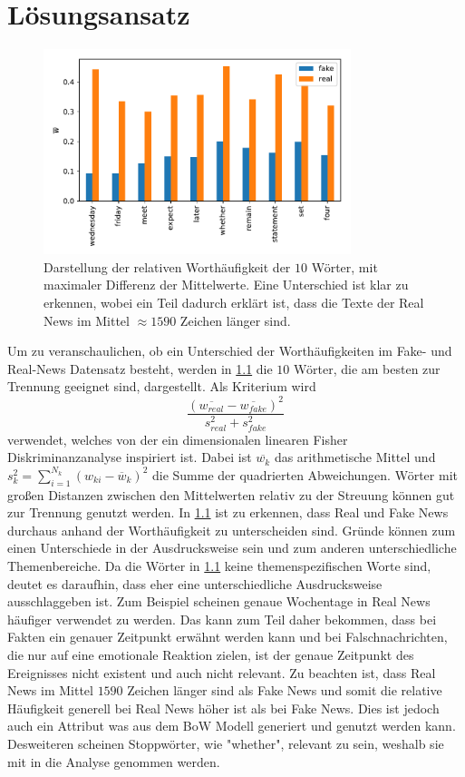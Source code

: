 \chapter{Lösungsansatz}

\begin{figure}
    \centering
    \includegraphics[width=0.8\textwidth]{pictures/data_visualisation.pdf}
    \caption{Darstellung der relativen Worthäufigkeit der $10$ Wörter, mit maximaler Differenz der Mittelwerte.
            Eine Unterschied ist klar zu erkennen, wobei ein Teil dadurch erklärt ist, dass die Texte der Real 
            News im Mittel $\approx 1590$ Zeichen länger sind.}
    \label{fig:word_plot}
\end{figure}
Um zu veranschaulichen, ob ein Unterschied der Worthäufigkeiten im Fake- und Real-News Datensatz besteht, werden in \ref{fig:word_plot}
die $10$ Wörter, die am besten zur Trennung geeignet sind, dargestellt. 
Als Kriterium wird 
\begin{equation}
    \frac{(\overline{w_{real}}-\overline{w_{fake}})^2}{s_{real}^2+s_{fake}^2}
\end{equation}
verwendet, welches von der ein dimensionalen linearen Fisher Diskriminanzanalyse inspiriert ist. 
Dabei ist $\overline{w_k}$ das arithmetische Mittel und $s_{k}^{2}=\sum_{i=1}^{N_{k}}\left(w_{k i}-\overline{w}_{k}\right)^{2}$ 
die Summe der quadrierten Abweichungen.
Wörter mit großen Distanzen zwischen den Mittelwerten relativ zu der Streuung können gut zur Trennung genutzt werden.
In \ref{fig:word_plot} ist zu erkennen, dass Real und Fake News durchaus anhand der Worthäufigkeit zu unterscheiden sind. 
Gründe können zum einen Unterschiede in der Ausdrucksweise sein und zum anderen unterschiedliche Themenbereiche. Da die 
Wörter in \ref{fig:word_plot} keine themenspezifischen Worte sind, deutet es daraufhin, dass eher eine unterschiedliche 
Ausdrucksweise ausschlaggeben ist. 
Zum Beispiel scheinen genaue Wochentage in Real News häufiger verwendet zu werden. 
Das kann zum Teil daher bekommen, dass bei Fakten ein genauer Zeitpunkt erwähnt werden kann und bei Falschnachrichten, die 
nur auf eine emotionale Reaktion zielen, ist der genaue Zeitpunkt des Ereignisses nicht existent und auch nicht relevant.
Zu beachten ist, dass Real News im Mittel $\num{1590}$ Zeichen länger sind als Fake News und somit die relative Häufigkeit 
generell bei Real News höher ist als bei Fake News. 
Dies ist jedoch auch ein Attribut was aus dem BoW Modell generiert und genutzt werden kann.
Desweiteren scheinen Stoppwörter, wie "whether", relevant zu sein, weshalb sie mit in die Analyse genommen werden.

